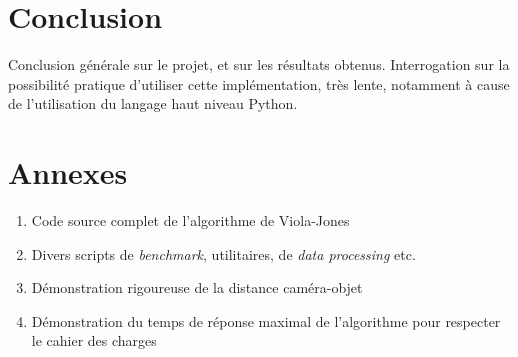 \documentclass[12pt,a4paper]{article}
\begin{document}
\section{Conclusion}
Conclusion générale sur le projet, et sur les résultats obtenus. Interrogation sur la possibilité pratique d'utiliser cette implémentation, très lente, notamment à cause de l'utilisation du langage haut niveau Python.

\section*{Annexes}
\begin{enumerate}
    \item Code source complet de l'algorithme de Viola-Jones
    \item Divers scripts de \textit{benchmark}, utilitaires, de \textit{data processing} etc.
    \item Démonstration rigoureuse de la distance caméra-objet
    \item Démonstration du temps de réponse maximal de l'algorithme pour respecter le cahier des charges
\end{enumerate}
\end{document}
